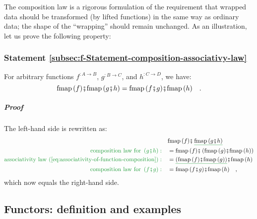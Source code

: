 The composition law is a rigorous formulation of the requirement that
wrapped data should be transformed (by lifted functions) in the same
way as ordinary data; the shape of the \textsf{``}wrapping\textsf{''} should remain
unchanged. As an illustration, let us prove the following  property:

\subsubsection{Statement \label{subsec:f-Statement-composition-associativy-law}\ref{subsec:f-Statement-composition-associativy-law}}

For arbitrary functions $f^{:A\rightarrow B}$, $g^{:B\rightarrow C}$,
and $h^{:C\rightarrow D}$, we have:
\[
\text{fmap}\,(f)\bef\text{fmap}\,(g\bef h)=\text{fmap}\,(f\bef g)\bef\text{fmap}\,(h)\quad.
\]


\subparagraph{Proof}

The left-hand side is rewritten as:
\begin{align*}
 & \text{fmap}\,(f)\bef\,\gunderline{\text{fmap}\,(g\bef h)}\\
{\color{greenunder}\text{composition law for }\left(g\bef h\right):}\quad & =\text{fmap}\,(f)\bef\left(\text{fmap}\,(g)\bef\text{fmap}\,(h)\right)\\
{\color{greenunder}\text{associativity law (\ref{eq:associativity-of-function-composition})}:}\quad & =\gunderline{\left(\text{fmap}\,(f)\bef\text{fmap}\,(g)\right)}\bef\text{fmap}\,(h)\\
{\color{greenunder}\text{composition law for }\left(f\bef g\right):}\quad & =\text{fmap}\,(f\bef g)\bef\text{fmap}\,(h)\quad,
\end{align*}
which now equals the right-hand side.

\subsection{Functors: definition and examples\label{subsec:Functors:-definition-and-examples}}

